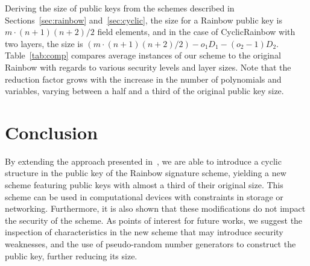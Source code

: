 \documentclass[12pt]{article}
\begin{document}
Deriving the size of public keys from the schemes described in Sections~\ref{sec:rainbow} and~\ref{sec:cyclic}, the size for a Rainbow public key is $m \cdot (n + 1)(n + 2)/2$ field elements, and in the case of CyclicRainbow with two layers, the size is $(m \cdot (n + 1)(n + 2)/2) - o_{1} D_{1} - (o_{2} - 1) D_{2}$. Table~\ref{tab:comp} compares average instances of our scheme to the original Rainbow with regards to various security levels and layer sizes. Note that the reduction factor grows with the increase in the number of polynomials and variables, varying between a half and a third of the original public key size.

\section{Conclusion}\label{sec:conclusion}

By extending the approach presented in~\cite{Petzoldt:inproc:2010:jun}, we are able to introduce a cyclic structure in the public key of the Rainbow signature scheme, yielding a new scheme featuring public keys with almost a third of their original size. This scheme can be used in computational devices with constraints in storage or networking. Furthermore, it is also shown that these modifications do not impact the security of the scheme. As points of interest for future works, we suggest the inspection of characteristics in the new scheme that may introduce security weaknesses, and the use of pseudo-random number generators to construct the public key, further reducing its size.


{\small
}
\end{document}
